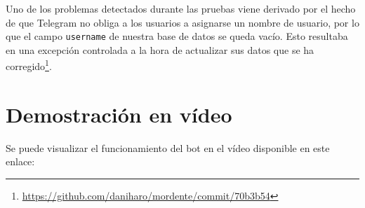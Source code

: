 Uno de los problemas detectados durante las pruebas viene derivado por el hecho de que Telegram no obliga a los usuarios a asignarse un nombre de usuario, por lo que el campo \texttt{username} de nuestra base de datos se queda vacío. Esto resultaba en una excepción controlada a la hora de actualizar sus datos que se ha corregido\footnote{\url{https://github.com/daniharo/mordente/commit/70b3b54}}.


\section{Demostración en vídeo}

Se puede visualizar el funcionamiento del bot en el vídeo disponible en este enlace:
\url{}

